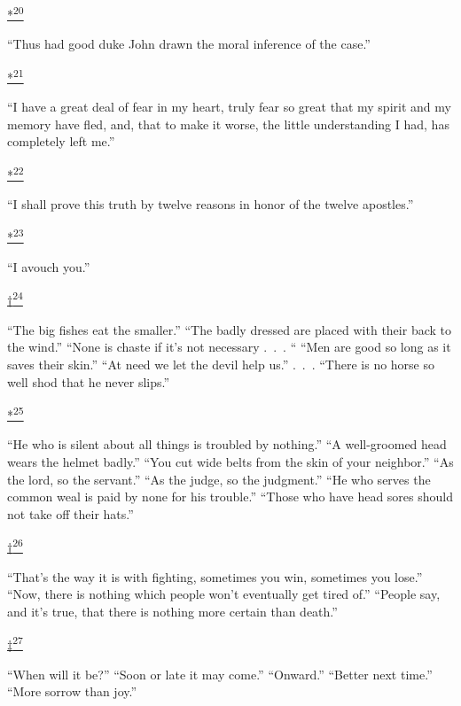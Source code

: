 \protect\hypertarget{23_NOTES.xhtmlux5cux23id_2607}{\protect\hyperlink{18_Chapter_Eleven__THE_FORMS_OF_THO.xhtmlux5cux23id_2608}{*\textsuperscript{20}}}
``Thus had good duke John drawn the moral inference of the case.''

\protect\hypertarget{23_NOTES.xhtmlux5cux23id_2610}{\protect\hyperlink{18_Chapter_Eleven__THE_FORMS_OF_THO.xhtmlux5cux23id_2609}{*\textsuperscript{21}}}
``I have a great deal of fear in my heart, truly fear so great that my
spirit and my memory have fled, and, that to make it worse, the little
understanding I had, has completely left me.''

\protect\hypertarget{23_NOTES.xhtmlux5cux23id_2612}{\protect\hyperlink{18_Chapter_Eleven__THE_FORMS_OF_THO.xhtmlux5cux23id_2611}{*\textsuperscript{22}}}
``I shall prove this truth by twelve reasons in honor of the twelve
apostles.''

\protect\hypertarget{23_NOTES.xhtmlux5cux23id_2344}{\protect\hyperlink{18_Chapter_Eleven__THE_FORMS_OF_THO.xhtmlux5cux23id_2343}{*\textsuperscript{23}}}
``I avouch you.''

\protect\hypertarget{23_NOTES.xhtmlux5cux23id_2346}{\protect\hyperlink{18_Chapter_Eleven__THE_FORMS_OF_THO.xhtmlux5cux23id_2345}{†\textsuperscript{24}}}
``The big fishes eat the smaller.'' ``The badly dressed are placed with
their back to the wind.'' ``None is chaste if it's not necessary .~.~.
`` ``Men are good so long as it saves their skin.'' ``At need we let the
devil help us.'' .~.~. ``There is no horse so well shod that he never
slips.''

\protect\hypertarget{23_NOTES.xhtmlux5cux23id_2614}{\protect\hyperlink{18_Chapter_Eleven__THE_FORMS_OF_THO.xhtmlux5cux23id_2613}{*\textsuperscript{25}}}
``He who is silent about all things is troubled by nothing.'' ``A
well-groomed head wears the helmet badly.'' ``You cut wide belts from
the skin of your neighbor.'' ``As the lord, so the servant.'' ``As the
judge, so the judgment.'' ``He who serves the common weal is paid by
none for his trouble.'' ``Those who have head sores should not take off
their hats.''

\protect\hypertarget{23_NOTES.xhtmlux5cux23id_2616}{\protect\hyperlink{18_Chapter_Eleven__THE_FORMS_OF_THO.xhtmlux5cux23id_2615}{†\textsuperscript{26}}}
``That's the way it is with fighting, sometimes you win, sometimes you
lose.'' ``Now, there is nothing which people won't eventually get tired
of.'' ``People say, and it's true, that there is nothing more certain
than death.''

\protect\hypertarget{23_NOTES.xhtmlux5cux23id_2618}{\protect\hyperlink{18_Chapter_Eleven__THE_FORMS_OF_THO.xhtmlux5cux23id_2617}{‡\textsuperscript{27}}}
``When will it be?'' ``Soon or late it may come.'' ``Onward.'' ``Better
next time.'' ``More sorrow than joy.''

